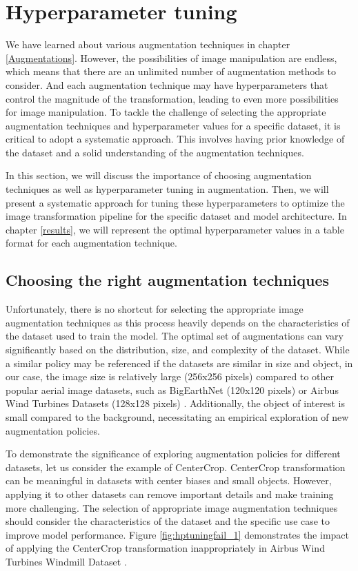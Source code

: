 \section{Hyperparameter tuning}\label{hptuning}
We have learned about various augmentation techniques in chapter \ref{Augmentations}. However, the possibilities of image manipulation are endless, which means that there are an unlimited number of augmentation methods to consider. And each augmentation technique may have hyperparameters that control the magnitude of the transformation, leading to even more possibilities for image manipulation. To tackle the challenge of selecting the appropriate augmentation techniques and hyperparameter values for a specific dataset, it is critical to adopt a systematic approach. This involves having prior knowledge of the dataset and a solid understanding of the augmentation techniques.

In this section, we will discuss the importance of choosing augmentation techniques as well as hyperparameter tuning in augmentation. Then, we will present a systematic approach for tuning these hyperparameters to optimize the image transformation pipeline for the specific dataset and model architecture. In chapter \ref{results}, we will represent the optimal hyperparameter values in a table format for each augmentation technique.

\subsection{Choosing the right augmentation techniques}
Unfortunately, there is no shortcut for selecting the appropriate image augmentation techniques as this process heavily depends on the characteristics of the dataset used to train the model. The optimal set of augmentations can vary significantly based on the distribution, size, and complexity of the dataset. While a similar policy may be referenced if the datasets are similar in size and object, in our case, the image size is relatively large (256x256 pixels) compared to other popular aerial image datasets, such as BigEarthNet (120x120 pixels) \cite{sumbul2019bigearthnet} or Airbus Wind Turbines Datasets (128x128 pixels) \cite{windmilldataset}. Additionally, the object of interest is small compared to the background, necessitating an empirical exploration of new augmentation policies.

To demonstrate the significance of exploring augmentation policies for different datasets, let us consider the example of CenterCrop. CenterCrop transformation can be meaningful in datasets with center biases and small objects. However, applying it to other datasets can remove important details and make training more challenging. The selection of appropriate image augmentation techniques should consider the characteristics of the dataset and the specific use case to improve model performance. Figure \ref{fig:hptuningfail_1} demonstrates the impact of applying the CenterCrop transformation inappropriately in Airbus Wind Turbines Windmill Dataset \cite{windmilldataset}.

